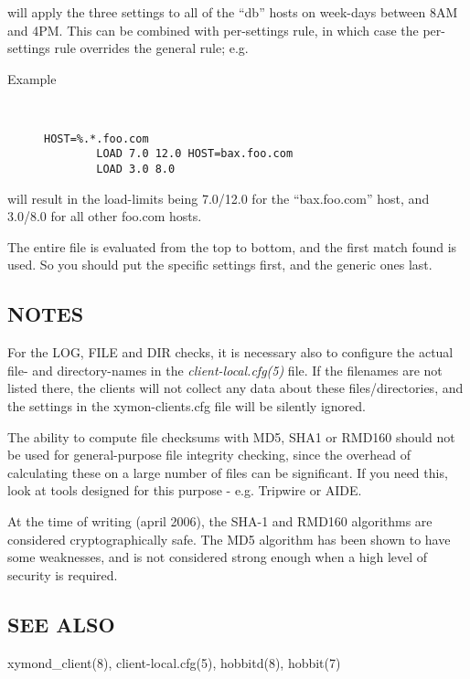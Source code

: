   will apply the three settings to all of the ``db'' hosts on
  week-days between 8AM and 4PM. This can be combined with
  per-settings rule, in which case the per-settings rule overrides the
  general rule; e.g. 

\begin{description}\item[Example]\begin{verbatim}


HOST=%.*.foo.com
        LOAD 7.0 12.0 HOST=bax.foo.com
        LOAD 3.0 8.0

\end{verbatim}


\end{description}



  will result in the load-limits being 7.0/12.0 for the
  ``bax.foo.com'' host, and 3.0/8.0 for all other foo.com hosts. 

  The entire file is evaluated from the top to bottom, and the first
  match found is used. So you should put the specific settings first,
  and the generic ones last. 
 
\subsection{NOTES}
 For the LOG, FILE and DIR checks, it is necessary also to configure
 the actual file- and directory-names in the
 \emph{client-local.cfg(5)} file. If the filenames are not listed
 there, the clients will not collect any data about these
 files/directories, and the settings in the xymon-clients.cfg file
 will be silently ignored. 


  The ability to compute file checksums with MD5, SHA1 or RMD160
  should not be used for general-purpose file integrity checking,
  since the overhead of calculating these on a large number of files
  can be significant. If you need this, look at tools designed for
  this purpose - e.g. Tripwire or AIDE. 



  At the time of writing (april 2006), the SHA-1 and RMD160 algorithms
  are considered cryptographically safe. The MD5 algorithm has been
  shown to have some weaknesses, and is not considered strong enough
  when a high level of security is required. 



\subsection{SEE ALSO}
xymond\_client(8), client-local.cfg(5), hobbitd(8), hobbit(7) 

